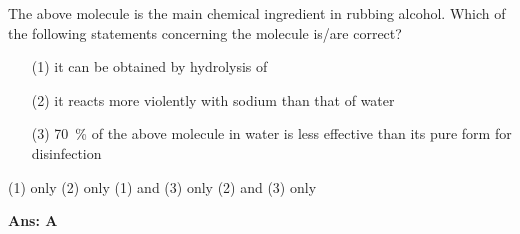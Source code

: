 \documentclass[border=3pt,varwidth=70mm]{standalone}
\begin{document}
\begin{center}
\end{center}

The above molecule is the main chemical ingredient in rubbing alcohol. Which of the following statements concerning the molecule is/are correct?

\begin{itemize}
\item[(1)] it can be obtained by hydrolysis of 
\item[(2)] it reacts more violently with sodium than that of water
\item[(3)] \SI{70}{\percent} of the above molecule in water is less effective than its pure form for disinfection
\end{itemize}

\begin{choices}
\choice (1) only
\choice (2) only
\choice (1) and (3) only
\choice (2) and (3) only
\end{choices}

\begin{answer}
\hrulefill\par
\textbf{Ans: A}





\end{answer}
\end{document}
